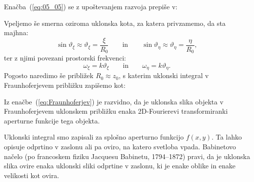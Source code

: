 Enačba~(\ref{eq:05_05}) se z upoštevanjem razvoja prepiše v:

Vpeljemo še smerna oziroma uklonska kota,
za katera privzamemo, da sta majhna:
\begin{equation}
\sin \vartheta_\xi \approx \vartheta_\xi = \frac{\xi}{R_0}
\qquad \mathrm{in}
\qquad
\sin \vartheta_\eta \approx \vartheta_\eta = \frac{\eta}{R_0},
\label{eq:05_13}
\end{equation}
ter z njimi povezani prostorski frekvenci:
\begin{equation}
\omega_\xi = k \vartheta_\xi
\qquad \mathrm{in}
\qquad
\omega_\eta = k \vartheta_\eta.
\label{eq:05_14}
\end{equation}
Pogosto naredimo še približek $R_0 \approx z_0$, s katerim uklonski integral 
v Fraunhoferjevem približku zapišemo kot:

Iz enačbe~(\ref{eq:Fraunhoferjev}) je razvidno, 
da je uklonska slika objekta v Fraunhoferjevem uklonskem približku
enaka 2D-Fourierevi transformiranki aperturne funkcije tega objekta. 

\begin{remark}
Uklonski integral smo zapisali za splošno aperturno funkcijo $f(x,y)$. Ta lahko
opisuje odprtino v zaslonu ali pa oviro, na katero svetloba vpada.
Babinetovo načelo (po francoskem fiziku Jacquesu Babinetu, 1794--1872) pravi,
da je uklonska slika ovire enaka uklonski sliki odprtine v zaslonu, 
ki je enake oblike in enake velikosti kot ovira. 
\end{remark}

